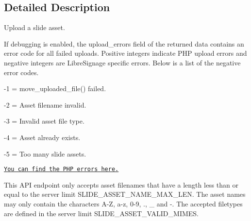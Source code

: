 \subsection{Detailed Description}
Upload a slide asset.

If debugging is enabled, the {\ttfamily upload\+\_\+errors} field of the returned data contains an error code for all failed uploads. Positive integers indicate P\+HP upload errors and negative integers are Libre\+Signage specific errors. Below is a list of the negative error codes.


\begin{DoxyItemize}
\item -\/1 = {\ttfamily move\+\_\+uploaded\+\_\+file()} failed.
\item -\/2 = Asset filename invalid.
\item -\/3 = Invalid asset file type.
\item -\/4 = Asset already exists.
\item -\/5 = Too many slide assets.
\end{DoxyItemize}

\href{http://php.net/manual/en/features.file-upload.errors.php}{\tt You can find the P\+HP errors here.}

This A\+PI endpoint only accepts asset filenames that have a length less than or equal to the server limit {\ttfamily S\+L\+I\+D\+E\+\_\+\+A\+S\+S\+E\+T\+\_\+\+N\+A\+M\+E\+\_\+\+M\+A\+X\+\_\+\+L\+EN}. The asset names may only contain the characters A-\/Z, a-\/z, 0-\/9, ., \+\_\+ and -\/. The accepted filetypes are defined in the server limit {\ttfamily S\+L\+I\+D\+E\+\_\+\+A\+S\+S\+E\+T\+\_\+\+V\+A\+L\+I\+D\+\_\+\+M\+I\+M\+ES}.

